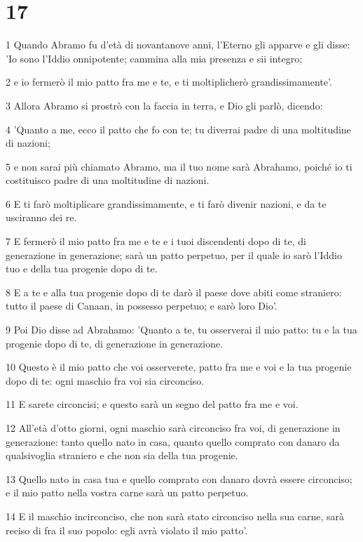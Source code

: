\chapter{17}

\par 1 Quando Abramo fu d'età di novantanove anni, l'Eterno gli apparve e gli disse: 'Io sono l'Iddio onnipotente; cammina alla mia presenza e sii integro;
\par 2 e io fermerò il mio patto fra me e te, e ti moltiplicherò grandissimamente'.
\par 3 Allora Abramo si prostrò con la faccia in terra, e Dio gli parlò, dicendo:
\par 4 'Quanto a me, ecco il patto che fo con te; tu diverrai padre di una moltitudine di nazioni;
\par 5 e non sarai più chiamato Abramo, ma il tuo nome sarà Abrahamo, poiché io ti costituisco padre di una moltitudine di nazioni.
\par 6 E ti farò moltiplicare grandissimamente, e ti farò divenir nazioni, e da te usciranno dei re.
\par 7 E fermerò il mio patto fra me e te e i tuoi discendenti dopo di te, di generazione in generazione; sarà un patto perpetuo, per il quale io sarò l'Iddio tuo e della tua progenie dopo di te.
\par 8 E a te e alla tua progenie dopo di te darò il paese dove abiti come straniero: tutto il paese di Canaan, in possesso perpetuo; e sarò loro Dio'.
\par 9 Poi Dio disse ad Abrahamo: 'Quanto a te, tu osserverai il mio patto: tu e la tua progenie dopo di te, di generazione in generazione.
\par 10 Questo è il mio patto che voi osserverete, patto fra me e voi e la tua progenie dopo di te: ogni maschio fra voi sia circonciso.
\par 11 E sarete circoncisi; e questo sarà un segno del patto fra me e voi.
\par 12 All'età d'otto giorni, ogni maschio sarà circonciso fra voi, di generazione in generazione: tanto quello nato in casa, quanto quello comprato con danaro da qualsivoglia straniero e che non sia della tua progenie.
\par 13 Quello nato in casa tua e quello comprato con danaro dovrà essere circonciso; e il mio patto nella vostra carne sarà un patto perpetuo.
\par 14 E il maschio incirconciso, che non sarà stato circonciso nella sua carne, sarà reciso di fra il suo popolo: egli avrà violato il mio patto'.
